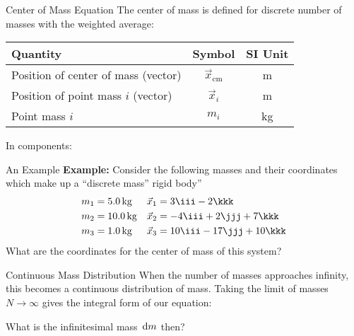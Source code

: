\documentclass[12pt,compress,aspectratio=169]{beamer}
\begin{document}
\begin{frame}{Center of Mass Equation}
  The center of mass is defined for discrete number of masses with the weighted
  average:

  \begin{center}
    \begin{tabular}{l|c|c}
      \rowcolor{pink}
      \textbf{Quantity} & \textbf{Symbol} & \textbf{SI Unit} \\ \hline
      Position of center of mass (vector) & $\vec x_\text{cm}$ & \si\metre \\
      Position of point mass $i$ (vector) & $\vec x_i$ & \si\metre \\
      Point mass $i$ & $m_i$ & \si{\kilo\gram}
    \end{tabular}
  \end{center}
  In components:

\end{frame}



\begin{frame}{An Example}
  \textbf{Example:} Consider the following masses and their coordinates
  which make up a ``discrete mass'' rigid body''
  \begin{align*}
    m_1&=\SI{5.0}{\kg} &\vec x_1&=3\iii-2\kkk\\
    m_2&=\SI{10.0}{\kg}&\vec x_2&=-4\iii+2\jjj+7\kkk\\
    m_3&=\SI{1.0}{\kg}&\vec x_3&=10\iii-17\jjj+10\kkk
  \end{align*}
  What are the coordinates for the center of mass of this system?
\end{frame}



\begin{frame}{Continuous Mass Distribution}
  When the number of masses approaches infinity, this becomes a continuous
  distribution of mass. Taking the limit of masses $N\rightarrow\infty$ gives
  the integral form of our equation:


  What is the infinitesimal mass $\dl m$ then?
\end{frame}
\end{document}
